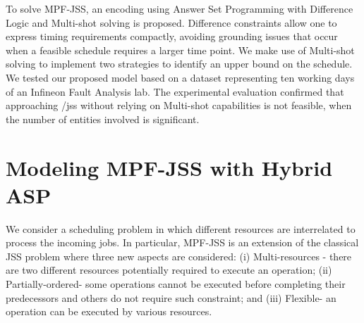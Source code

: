 \documentclass[submission,copyright,creativecommons]{eptcs}
\begin{document}
To solve MPF-JSS, an encoding using Answer Set Programming with Difference Logic \cite{gebser2016theory} and Multi-shot solving \cite{gebser2019multi} is proposed. Difference constraints allow one to express timing requirements compactly, avoiding grounding issues that occur when a feasible schedule requires a larger time point. We make use of Multi-shot solving to implement two strategies to identify an upper bound on the schedule.
We tested our proposed model based on a dataset representing ten working days of an Infineon Fault Analysis lab. The experimental evaluation confirmed that approaching /jss without relying on Multi-shot capabilities is not feasible, when the number of entities involved is significant.  %

\section{Modeling MPF-JSS with Hybrid ASP}\label{sec:aspmodeling}
We consider a scheduling problem in which different resources are interrelated to process the incoming jobs. In particular, MPF-JSS is an extension of the classical JSS problem where three new aspects are considered: (i) Multi-resources - there are two different resources potentially required to execute an operation; (ii) Partially-ordered- some operations cannot be executed before completing their predecessors and others do not require such constraint; and (iii) Flexible- an operation can be executed by various resources. 
\end{document}
